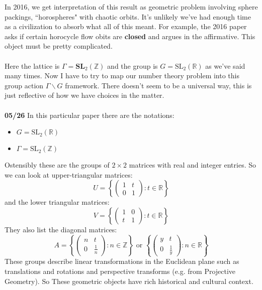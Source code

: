 \documentclass[12pt]{article}
\begin{document}
{In 2016, we get interpretation of this result as geometric problem involving sphere packings, ``horospheres" with chaotic orbits.  It's unlikely we've had enough time as a civilization to absorb what all of this meant.  For example, the 2016 paper asks if certain horocycle flow obits are \textbf{closed} and argues in the affirmative.  This object must be pretty complicated.\\ \\
Here the lattice is $\Gamma = \textbf{SL}_2 (\mathbb{Z})$ 
and the group is $G = \text{SL}_2(\mathbb{R})$ as we've said many times.  Now I have to try to map our number theory problem into this group action $\Gamma \backslash G$ framework.  There doesn't seem to be a universal way, this is just reflective of how we have choices in the matter. \\ \\
\textbf{05/26} In this particular paper there are the notations:
\begin{itemize}
\item $G = \text{SL}_2(\mathbb{R})$ 
\item $\Gamma = \text{SL}_2(\mathbb{Z})$
\end{itemize}
Ostensibly these are the groups of $2 \times 2$ matrices with real and integer entries.  So we can look at upper-triangular matrices:
$$  U = 
\left\{ \left( \begin{array}{cc} 1 & t \\ 0 & 1\end{array}\right) : t \in \mathbb{R} \right\}$$
and the lower triangular matrices:
$$  V = 
\left\{ \left(\begin{array}{cc} 1 & 0 \\ t & 1\end{array}\right) : t \in \mathbb{R} \right\}$$
They also list the diagonal matrices:
$$  A = 
\left\{ \left(\begin{array}{cc} n & t \\ 0 & \frac{1}{n} \end{array}\right) : n  \in \mathbb{Z} \right\} \text{ or }
\left\{ \left(\begin{array}{cc} y & t \\ 0 & \frac{1}{y} \end{array}\right) : n  \in \mathbb{R} \right\}$$
These groups describe linear transformations in the Euclidean plane such as translations and rotations and perspective transforms (e.g. from Projective Geometry).  So These geometric objects have rich historical and cultural context. \\ \\
}
\end{document}
